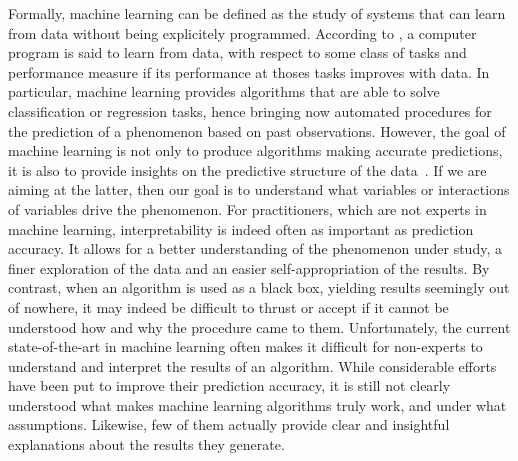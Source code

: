 Formally, machine learning can be defined as the study of systems that can
learn from data without being explicitely programmed. According to
\citet{mitchell:1997}, a computer program is said to learn from data, with
respect to some class of tasks and performance measure if its performance at
thoses tasks improves with data. In particular, machine learning provides
algorithms that are able to solve classification or regression tasks, hence
bringing now automated procedures for the prediction of a phenomenon based on
past observations. However, the goal of machine learning is not only to produce
algorithms making accurate predictions, it is also to provide insights on the
predictive structure of the data~\citep{breiman:1984}. If we are aiming at the
latter, then our goal is to understand what variables or interactions of
variables drive the phenomenon. For practitioners, which are not experts in
machine learning, interpretability is indeed often as important as prediction
accuracy. It allows for a better understanding of the phenomenon under study, a
finer exploration of the data and an easier self-appropriation of the results.
By contrast, when an algorithm is used as a black box, yielding results
seemingly out of nowhere, it may indeed be difficult to thrust or accept if it
cannot be understood how and why the procedure came to them. Unfortunately, the
current state-of-the-art in machine learning often makes it difficult for
non-experts to understand and interpret the results of an algorithm. While
considerable efforts have been put to improve their prediction accuracy, it is
still not clearly understood what makes machine learning algorithms truly work,
and under what assumptions. Likewise, few of them actually provide clear and
insightful explanations about the results they generate.

